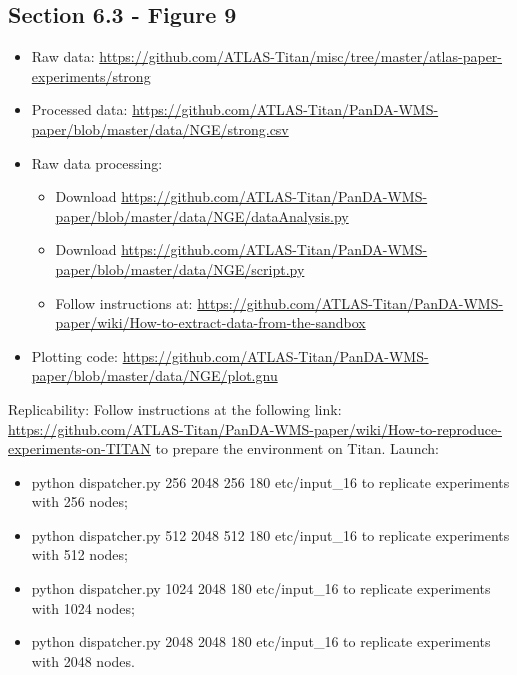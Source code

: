 \subsection{Section 6.3 - Figure 9}
\label{apndx:fig16}

\label{apndx:fig10}
\begin{itemize}
    \item Raw data: \url{https://github.com/ATLAS-Titan/misc/tree/master/atlas-paper-experiments/strong}
     \item Processed data: \url{ https://github.com/ATLAS-Titan/PanDA-WMS-paper/blob/master/data/NGE/strong.csv} 
    \item Raw data processing: 
    	\begin{itemize}
    		\item Download \url{https://github.com/ATLAS-Titan/PanDA-WMS-paper/blob/master/data/NGE/dataAnalysis.py}
    		\item Download \url{https://github.com/ATLAS-Titan/PanDA-WMS-paper/blob/master/data/NGE/script.py}
    		\item Follow instructions at: \url{https://github.com/ATLAS-Titan/PanDA-WMS-paper/wiki/How-to-extract-data-from-the-sandbox}
   	\end{itemize}
    \item Plotting code: \url{https://github.com/ATLAS-Titan/PanDA-WMS-paper/blob/master/data/NGE/plot.gnu}
\end{itemize}

Replicability: Follow instructions at the following link: \url{https://github.com/ATLAS-Titan/PanDA-WMS-paper/wiki/How-to-reproduce-experiments-on-TITAN} to prepare the environment on Titan.
Launch:
\begin{itemize}
\item python dispatcher.py 256  2048 256 180 etc/input\_16 to replicate experiments with 256 nodes;
\item python dispatcher.py 512 2048 512 180 etc/input\_16 to replicate experiments with 512 nodes;
\item python dispatcher.py 1024 2048 180 etc/input\_16 to replicate experiments with 1024 nodes;
\item python dispatcher.py 2048 2048 180 etc/input\_16 to replicate experiments with 2048 nodes.
\end{itemize}




